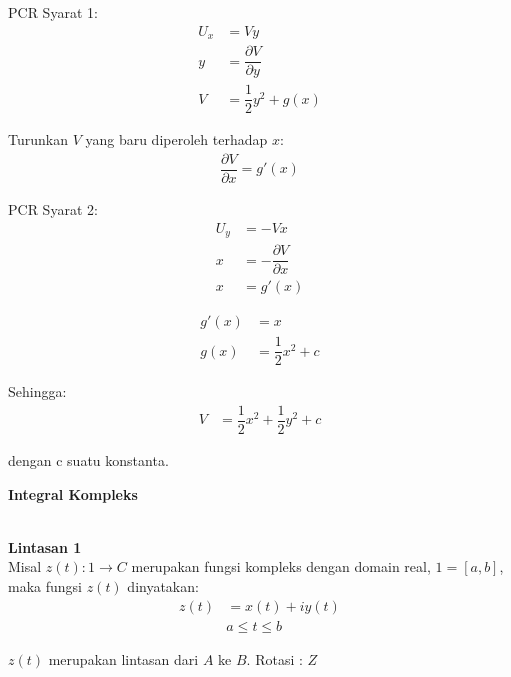 \documentclass{article}
\begin{document}
PCR Syarat 1:
\begin{align}
    U_x & = Vy
    \nonumber                              \\
    y   & = \dfrac{\partial V}{\partial y}
    \nonumber                              \\
    V   & = \dfrac{1}{2} y^2 + g(x)
    \nonumber
\end{align}

Turunkan $V$ yang baru diperoleh terhadap $x$:
\begin{align}
    \dfrac{\partial V}{\partial x} = g'(x)
    \nonumber
\end{align}

PCR Syarat 2:
\begin{align}
    U_y & = -Vx
    \nonumber                               \\
    x   & = -\dfrac{\partial V}{\partial x}
    \nonumber                               \\
    x   & = g'(x)
    \nonumber
\end{align}

\begin{align}
    g'(x) & = x
    \nonumber                      \\
    g(x)  & = \dfrac{1}{2} x^2 + c
    \nonumber
\end{align}

Sehingga:
\begin{align}
    V & = \dfrac{1}{2} x^2 + \dfrac{1}{2} y^2 + c
    \nonumber
\end{align}

dengan c suatu konstanta.



\newpage
\begin{center}
    \textbf{Integral Kompleks}
\end{center}
\leavevmode\\

\textbf{Lintasan 1}
\\

Misal $z(t) : 1 \rightarrow C$ merupakan fungsi kompleks dengan domain real, $1=[a,b]$, maka fungsi $z(t)$ dinyatakan:
\begin{align}
    z(t) & = x(t) + iy(t)
    \nonumber              \\
         & a \leq t \leq b
    \nonumber
\end{align}


$z(t)$ merupakan lintasan dari $A$ ke $B$. Rotasi : $Z$\\
\end{document}
